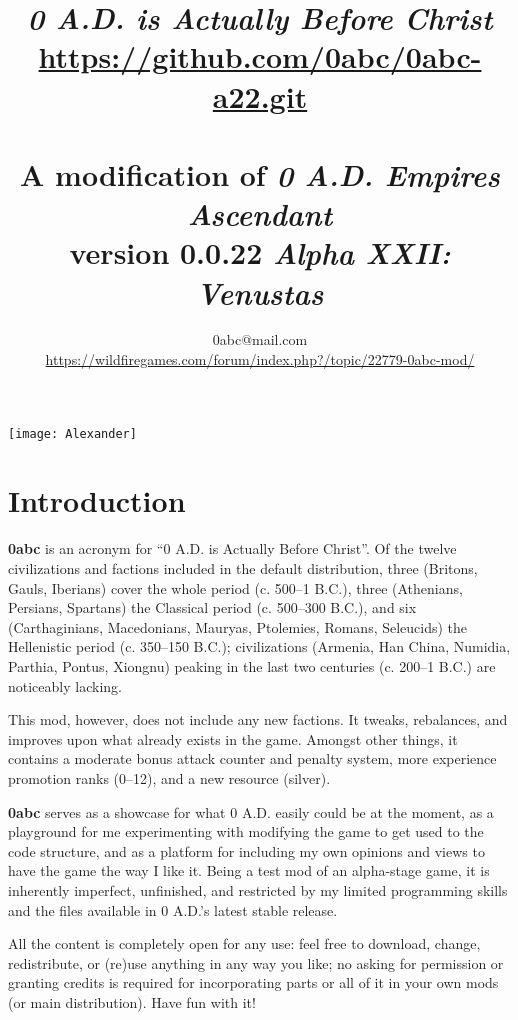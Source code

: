 \documentclass{article}
\title{
  \textit{\emph{\textbf{0}} A.D. is \emph{\textbf{A}}ctually \emph{\textbf{B}}efore \emph{\textbf{C}}hrist}\\
  \url{https://github.com/0abc/0abc-a22.git}\\
  \ \\
  \large A modification of \textit{0 A.D. Empires Ascendant}\\
  version 0.0.22 \textit{Alpha XXII: Venustas}
}
\author{0abc@mail.com\\\url{https://wildfiregames.com/forum/index.php?/topic/22779-0abc-mod/}}
\begin{document}
\maketitle

\begin{center}
\texttt{[image: Alexander]}
\end{center}

\clearpage
\tableofcontents

\clearpage
\section{Introduction}
\textbf{0abc} is an acronym for ``0 A.D. is Actually Before Christ''. Of the twelve civilizations and factions included in the default distribution, three (Britons, Gauls, Iberians) cover the whole period (c. 500--1 B.C.), three (Athenians, Persians, Spartans) the Classical period (c. 500--300 B.C.), and six (Carthaginians, Macedonians, Mauryas, Ptolemies, Romans, Seleucids) the Hellenistic period (c. 350--150 B.C.); civilizations (Armenia, Han China, Numidia, Parthia, Pontus, Xiongnu) peaking in the last two centuries (c. 200--1 B.C.) are noticeably lacking. %

This mod, however, does not include any new factions. It tweaks, rebalances, and improves upon what already exists in the game. Amongst other things, it contains a moderate bonus attack counter and penalty system, more experience promotion ranks (0--12), and a new resource (silver).

\textbf{0abc} serves as a showcase for what 0 A.D. easily could be at the moment, as a playground for me experimenting with modifying the game to get used to the code structure, and as a platform for including my own opinions and views to have the game the way I like it. Being a test mod of an alpha-stage game, it is inherently imperfect, unfinished, and restricted by my limited programming skills and the files available in 0 A.D.'s latest stable release. 

All the content is completely open for any use: feel free to download, change, redistribute, or (re)use anything in any way you like; no asking for permission or granting credits is required for incorporating parts or all of it in your own mods (or main distribution). Have fun with it!

\end{document}
